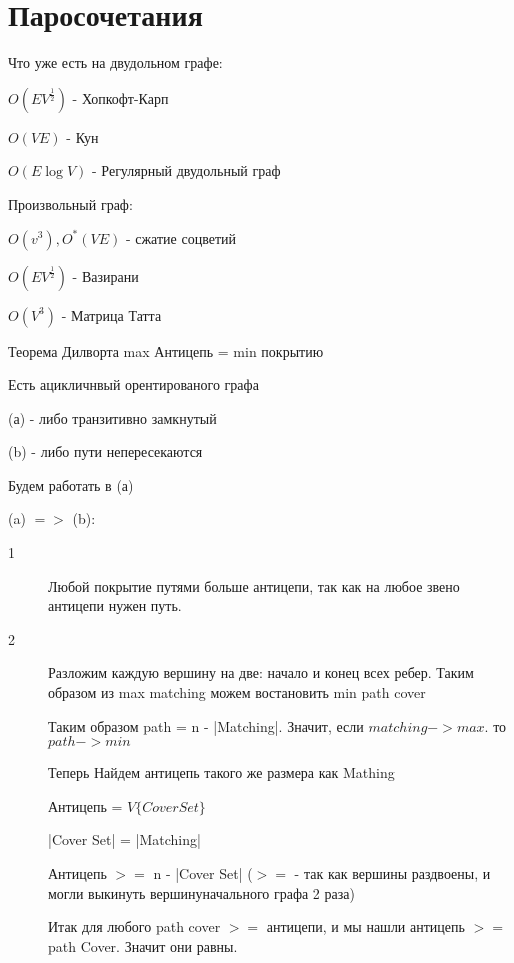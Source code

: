 ﻿\section{Паросочетания}

Что уже есть на двудольном графе:

$O(E V^{\frac{1}{2}})$ - Хопкофт-Карп

$O(VE)$ - Кун

$O(E \log{V})$ - Регулярный двудольный граф

Произвольный граф:

$O(v^3), O^*(VE)$ - сжатие соцветий

$O(E V^{\frac{1}{2}})$ - Вазирани

$O(V^3)$ - Матрица Татта

\begin{theorem}{Теорема Дилворта}
    max Антицепь = min покрытию
\end{theorem}
\begin{lemma}{}
Есть ацикличнвый орентированого графа

(а) - либо транзитивно замкнутый

(b) - либо пути непересекаются

Будем работать в (а)

(a) $=>$ (b):


\end{lemma}

\begin{description}
\item[1] 

Любой покрытие путями больше антицепи, так как на любое звено антицепи нужен путь.

\item[2] 
Разложим каждую вершину на две: начало и конец всех ребер. Таким образом из  max matching можем востановить min path cover



Таким образом path = n - |Matching|. Значит, если $matching -> max$. то $path -> min$

Теперь Найдем антицепь такого же размера как Mathing

Антицепь = $V\{Cover Set\}$



|Cover Set| = |Matching|

Антицепь $>=$ n - |Cover Set|  ($>=$ - так как вершины раздвоены, и могли выкинуть вершинуначального графа 2 раза)

Итак для любого path cover $>=$ антицепи, и мы нашли антицепь $>=$ path Cover. Значит они равны.
\end{description}

